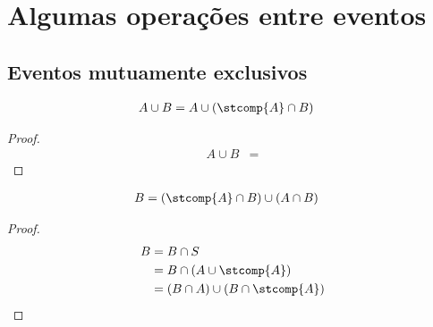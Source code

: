 \chapter{Algumas operações entre eventos}

\section{Eventos mutuamente exclusivos}

\begin{result}\label{res:app01-uniao-as-me}
    \begin{align*}
        A \cup B &= A \cup (\stcomp{A} \cap B)
    \end{align*}
\end{result}

\begin{proof}
    \begin{align*}
        A \cup B &=
    \end{align*}
\end{proof}

\begin{result}\label{res:app01-set-as-me}
    \begin{align*}
        B &= (\stcomp{A} \cap B) \cup (A \cap B)
    \end{align*}
\end{result}

\begin{proof}
    \begin{align*}
        B &= B \cap S \\
        &= B \cap (A \cup \stcomp{A}) \\
        &= (B \cap A) \cup (B \cap \stcomp{A}) \\
    \end{align*}
\end{proof}

